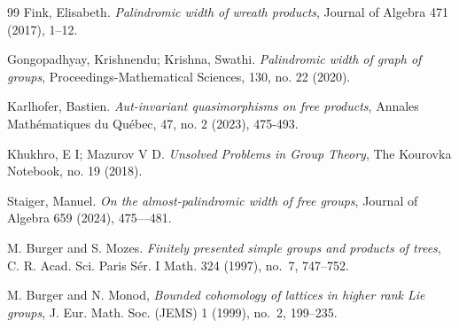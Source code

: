 \documentclass[12pt]{amsart}
\theoremstyle{definition}
\theoremstyle{remark}
\numberwithin{equation}{subsection}
\theoremstyle{plain}
\numberwithin{equation}{section}
\begin{document}
\begin{thebibliography}{99}
  Fink, Elisabeth. {\it  Palindromic width of wreath products}, Journal of Algebra 471 (2017), 1–12.

 Gongopadhyay, Krishnendu; Krishna, Swathi. {\it Palindromic width of graph of groups}, Proceedings-Mathematical Sciences, 130, no. 22 (2020).

 Karlhofer, Bastien. {\it Aut-invariant quasimorphisms on free products}, Annales Math\'ematiques du Qu\'ebec, 47, no. 2 (2023), 475-493. 

 Khukhro, E I; Mazurov V D. {\it Unsolved Problems in Group Theory}, The Kourovka Notebook, no. 19 (2018).


 Staiger, Manuel. {\it On the almost-palindromic width of free groups}, Journal of Algebra {659}
(2024), 475---481. 

 M. Burger and S. Mozes. {\it Finitely presented simple groups and products of trees}, C. R. Acad. Sci. Paris S\'er. I Math. { 324} (1997), no.~7, 747--752.

 M. Burger and N. Monod, {\it Bounded cohomology of lattices in higher rank Lie groups}, J. Eur. Math. Soc. (JEMS) { 1} (1999), no.~2, 199--235.

\end{thebibliography}
\end{document}
